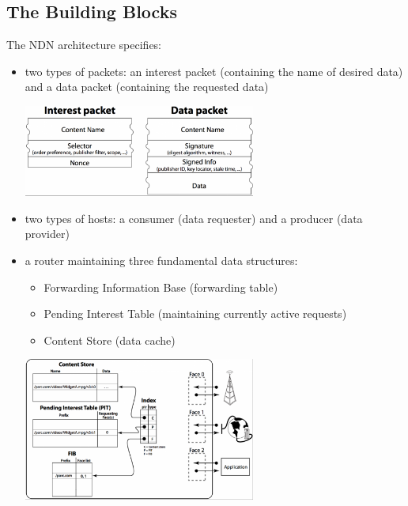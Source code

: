         \subsection{The Building Blocks}
            The NDN architecture specifies:
                \begin{itemize}
                    \item two types of packets: an interest packet (containing the name of desired data) and a data packet (containing the requested data)
                \begin{center}\includegraphics[width=0.6\textwidth]{media/ndn_packets1.png}\end{center}
                    \item two types of hosts: a consumer (data requester) and a producer (data provider)
                    \item a router maintaining three fundamental data structures:
                    \begin{itemize}
                        \item Forwarding Information Base (forwarding table)
                        \item Pending Interest Table (maintaining currently active requests)
                        \item Content Store (data cache)
                    \end{itemize}
                    \begin{center}\includegraphics[width=0.6\textwidth]{media/ndn_router1.png}\end{center}

                \end{itemize}

